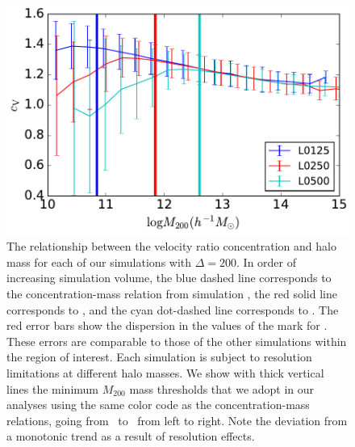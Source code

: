 \documentclass[usenatbib]{mnras}
\begin{document}
\begin{figure}
\centering
\includegraphics[width=.5\textwidth]{masscut_cV_d200.pdf}
\caption{The relationship between the velocity ratio concentration and halo mass for each of our simulations with $\Delta =200$. 
In order of increasing simulation volume, the blue dashed line corresponds to the concentration-mass relation from simulation 
\simA, the red solid line corresponds to \simB, and the cyan dot-dashed line corresponds to \simC. The red error bars show the
dispersion in the values of the mark for \simB. These errors are comparable to those of the other simulations
within the region of interest.
Each simulation is subject to resolution limitations at different halo masses. We show with thick vertical lines 
the minimum $M_{200}$ mass thresholds that we adopt in our analyses using the same color code as 
the concentration-mass relations, going from \simA \ to \simC \ from left to right. Note the deviation from a monotonic trend as a result of resolution effects. 
}
\label{fig:cvrelation}
\end{figure}
\end{document}

